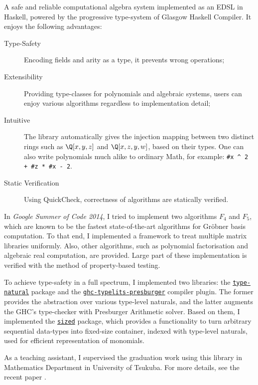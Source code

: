 \documentclass[letterpaper]{scrartcl}
\begin{document}
 \vspace{.5em}
 A safe and reliable computational algebra system implemented as an EDSL in Haskell, powered by the progressive type-system of Glasgow Haskell Compiler.
 It enjoys the following advantages:
 \begin{description}
  \item[Type-Safety] Encoding fields and arity as a type, it prevents wrong operations;
  \item[Extensibility] Providing type-classes for polynomials and algebraic systems, users can enjoy various algorithms regardless to implementation detail;
  \item[Intuitive] The library automatically gives the injection mapping between two distinct rings such as $\Q[x, y, z]$ and $\Q[x,z,y, w]$, based on their types.
             One can also write polynomials much alike to ordinary Math, for example: \verb|#x ^ 2 + #z * #x - 2|.
  \item[Static Verification] 
     Using QuickCheck, correctness of algorithms are statically verified.
 \end{description}

 In \emph{Google Summer of Code 2014}, I tried to implement two algorithms $F_4$ and $F_5$, which are known to be the fastest state-of-the-art algorithms for Gr\"{o}bner basis computation.
 To that end, I implemented a framework to treat multiple matrix libraries uniformly.
 Also, other algorithms, such as polynomial factorisation and algebraic real computation, are provided.
 Large part of these implementation is verified with the method of property-based testing.

 To achieve type-safety in a full spectrum, I implemented two libraries: the \href{http://hackage.haskell.org/package/type-natural}{\texttt{type-natural}} package and the \href{http://hackage.haskell.org/package/ghc-typelits-presburger}{\texttt{ghc-typelits-presburger}} compiler plugin.
 The former provides the abstraction over various type-level naturals, and the latter augments the GHC's type-checker with Presburger Arithmetic solver.
 Based on them, I implemented the \href{http://hackage.haskell.org/package/sized}{\texttt{sized}} package, which provides a functionality to turn arbitrary sequential data-types into fixed-size container, indexed with type-level naturals, used for efficient representation of monomials.

 As a teaching assistant, I supervised the graduation work using this library in Mathematics Department in University of Tsukuba.
 For more details, see the recent paper \cite{ISHII:2018ek}.
\end{document}

